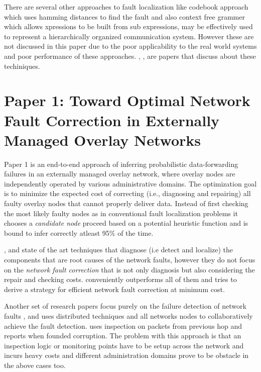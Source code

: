 \documentclass[10pt]{sigplan-proc-varsize}
\begin{document}
There are several other approaches to fault localization like codebook approach which uses hamming distances to find the fault and also context free grammer which allows xpressions to be built from sub expressions, may be effectively used to represent a hierarchically organized communication system. However these are not discussed in this paper due to the poor applicability to the real world systems and poor performance of these approaches. \cite{Calo:95}, \cite{Kliger:95}, \cite{Yemini:1996} are papers that discuss about these techiniques.

\section{Paper 1: Toward Optimal Network Fault Correction in Externally Managed Overlay Networks}
\cite{pclee:07} Paper 1 is an end-to-end approach of inferring probabilistic data-forwarding failures in an externally managed overlay network, where overlay nodes are independently operated by various administrative domains. The optimization goal is to minimize the expected cost of correcting (i.e., diagnosing and repairing) all faulty overlay nodes that cannot properly deliver data. Instead of first checking the most likely faulty nodes as in conventional fault localization problems it chooses a {\it candidate node} proceed based on a potential heuristic function and is bound to infer correctly atleast 95\% of the time.

\cite{Katzela:95}, \cite{Sethi:04} and \cite{Kandula:05} state of the art techniques that diagnose (i.e detect and localize) the components that are root causes of the network faults, however they do not focus on the {\it network fault correction} that is not only diagnosis but also considering the repair and checking costs. \cite{pclee:07} conveniently outperforms all of them and tries to derive a strategy for efficient network fault correction at minimum cost. 

Another set of research papers focus purely on the failure detection of network faults \cite{Zhuang:05}, \cite{Mizrak:05} and \cite{Avramopoulos:04} uses distributed techniques and all networks nodes to collaboratively achieve the fault detection. \cite{Avramopoulos:04} uses inspection on packets from previous hop and reports when founded corruption. The problem with this approach is that an inspection logic or monitoring points have to be setup across the network and incurs heavy costs and different administration domains prove to be obstacle in the above cases too. 
\end{document}
